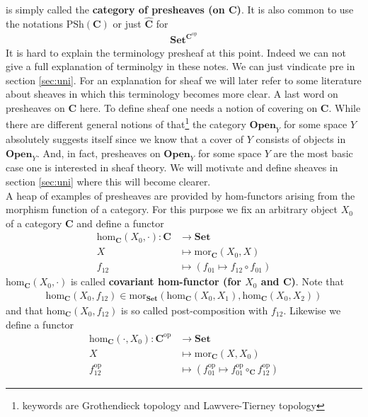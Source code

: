 is simply called the \textbf{category of presheaves (on $\mathbf{C}$)}. It is also common to use the notations $\mathrm{PSh}(\mathbf{C})$ or just $\widehat{\mathbf{C}}$ for
\begin{align*}
  \mathbf{Set}^{\mathbf{C}^{\mathrm{op}}}
\end{align*}
It is hard to explain the terminology {\grqq}presheaf{\grqq} at this point. Indeed we can not give a full explanation of terminolgy in these notes. We can just vindicate {\glqq}pre{\grqq} in section \ref{sec:uni}. For an explanation for {\glqq}sheaf{\grqq} we will later refer to some literature about sheaves in which this terminology becomes more clear. A last word on presheaves on $\mathbf{C}$ here. To define sheaf one needs a notion of covering on $\mathbf{C}$. While there are different general notions of that\footnote{keywords are Grothendieck topology and Lawvere-Tierney topology} the category $\mathbf{Open}_{Y}$ for some space $Y$ absolutely suggests itself since we know that a cover of $Y$ consists of objects in $\mathbf{Open}_{Y}$. And, in fact, presheaves on $\mathbf{Open}_{Y}$ for some space $Y$ are the most basic case one is interested in sheaf theory. We will motivate and define sheaves in section \ref{sec:uni} where this will become clearer.
\\
A heap of examples of presheaves are provided by hom-functors arising from the morphism function of a category. For this purpose we fix an arbitrary object $X_{0}$ of a category $\mathbf{C}$ and define a functor
\begin{align*}
  \mathrm{hom}_{\mathbf{C}}(X_{0},\cdot)
  \colon
  \mathbf{C}
  &\rightarrow
  \mathbf{Set}
  \\
  X
  &\mapsto
  \mathrm{mor}_{\mathbf{C}}(X_{0},X)
  \\
  f_{12}
  &\mapsto
  \left(
    f_{01}
    \mapsto
    f_{12}
    \circ
    f_{01}
  \right)
\end{align*}
$\mathrm{hom}_{\mathbf{C}}(X_{0},\cdot)$ is called \textbf{covariant hom-functor (for $X_{0}$ and $\mathbf{C}$)}. Note that
\begin{align*}
  \mathrm{hom}_{\mathbf{C}}(X_{0},f_{12})
  \in
  \mathrm{mor}_{\mathbf{Set}}
  \left(
    \mathrm{hom}_{\mathbf{C}}(X_{0},X_{1}),
    \mathrm{hom}_{\mathbf{C}}(X_{0},X_{2})
  \right)
\end{align*}
and that $\mathrm{hom}_{\mathbf{C}}(X_{0},f_{12})$ is so called post-composition with $f_{12}$. Likewise we define a functor
\begin{align*}
  \mathrm{hom}_{\mathbf{C}}(\cdot,X_{0})
  \colon
  \mathbf{C}^{\mathrm{op}}
  &\rightarrow
  \mathbf{Set}
  \\
  X
  &\mapsto
  \mathrm{mor}_{\mathbf{C}}(X,X_{0})
  \\
  f_{12}^{\mathrm{op}}
  &\mapsto
  \left(
    f_{01}^{\mathrm{op}}
    \mapsto
    f_{01}^{\mathrm{op}}
    \circ_{\mathbf{C}}
    f_{12}^{\mathrm{op}}
  \right)
\end{align*}
